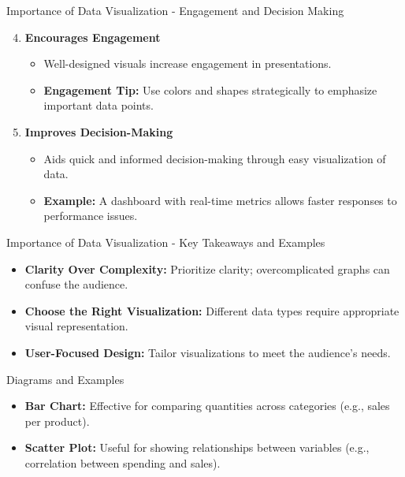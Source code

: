 \documentclass[aspectratio=169]{beamer}
\begin{document}
\begin{frame}[fragile]{Importance of Data Visualization - Engagement and Decision Making}
    \begin{enumerate}
        \setcounter{enumi}{3} %
        \item \textbf{Encourages Engagement}  
            \begin{itemize}
                \item Well-designed visuals increase engagement in presentations.
                \item \textbf{Engagement Tip:} Use colors and shapes strategically to emphasize important data points.
            \end{itemize}

        \item \textbf{Improves Decision-Making}  
            \begin{itemize}
                \item Aids quick and informed decision-making through easy visualization of data.
                \item \textbf{Example:} A dashboard with real-time metrics allows faster responses to performance issues.
            \end{itemize}
    \end{enumerate}
\end{frame}

\begin{frame}[fragile]{Importance of Data Visualization - Key Takeaways and Examples}
    \begin{itemize}
        \item \textbf{Clarity Over Complexity:} Prioritize clarity; overcomplicated graphs can confuse the audience.
        \item \textbf{Choose the Right Visualization:} Different data types require appropriate visual representation.
        \item \textbf{User-Focused Design:} Tailor visualizations to meet the audience's needs.
    \end{itemize}

    \begin{block}{Diagrams and Examples}
        \begin{itemize}
            \item \textbf{Bar Chart:} Effective for comparing quantities across categories (e.g., sales per product).
            \item \textbf{Scatter Plot:} Useful for showing relationships between variables (e.g., correlation between spending and sales).
        \end{itemize}
    \end{block}
\end{frame}
\end{document}
